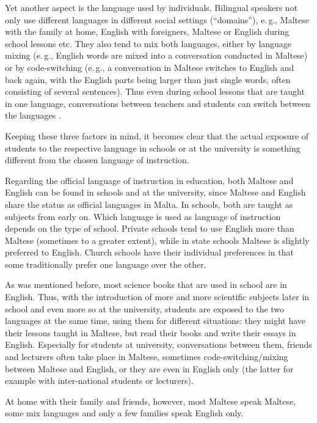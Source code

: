 \documentclass[]{../../metanetpaper}
\begin{document}
\begin{multicols}{2}
Yet another aspect is the language used by individuals. Bilingual speakers not only use different languages in different social settings (``domains''), e.\,g., Maltese with the family at home, English with foreigners, Maltese or English during school lessons etc. They also tend to mix both languages, either by language mixing (e.\,g., English words are mixed into a conversation conducted in Maltese) or by code-switching (e.\,g., a conversation in Maltese switches to English and back again, with the English parts being larger than just single words, often consisting of several sentences). Thus even during school lessons that are taught in one language, conversations between teachers and students can switch between the languages \cite{Camilleri:1995}.

Keeping these three factors in mind, it becomes clear that the actual exposure of students to the respective language in schools or at the university is something different from the chosen language of instruction.

Regarding the official language of instruction in education, both Maltese and English can be found in schools and at the university, since Maltese and English share the status as official languages in Malta. In schools, both are taught as subjects from early on. Which language is used as language of instruction depends on the type of school. Private schools tend to use English more than Maltese (sometimes to a greater extent), while in state schools Maltese is slightly preferred to English. Church schools have their individual preferences in that some traditionally prefer one language over the other. 

As was mentioned before, most science books that are used in school are in English. Thus, with the introduction of more and more scientific subjects later in school and even more so at the university, students are exposed to the two languages at the same time, using them for different situations: they might have their lessons taught in Maltese, but read their books and write their essays in English. Especially for students at university, conversations between them, friends and lecturers often take place in Maltese, sometimes code-switching/mixing between Maltese and English, or they are even in English only (the latter for example with inter-national students or lecturers).

At home with their family and friends, however, most Maltese speak Maltese, some mix languages and only a few families speak English only. 


\end{multicols}
\end{document}
